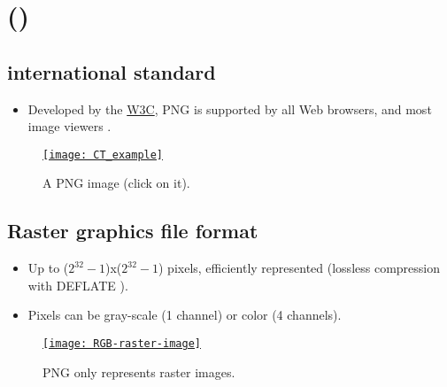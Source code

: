 \chapter{ ()}

\section{ international standard}
\begin{itemize}
\item Developed by the \href{https://www.w3.org/}{W3C}, \gls{PNG}
  \cite{roelofs1999png} is supported by all Web browsers, and most
  image viewers \cite{wikipedia_PNG}.
\end{itemize}
\begin{figure}[H]
  \vspace{-2ex}
  \centering
  \href{https://upload.wikimedia.org/wikipedia/commons/0/05/CT_of_a_normal_abdomen_and_pelvis%2C_coronal_plane_79.png}{\texttt{[image: CT\_example]}}\\
  \caption{A \gls{PNG} image (click on it).}
  \label{fig:PNG_example}
\end{figure}

\section{Raster graphics file format}
\begin{itemize}
\item Up to ($2^{32}-1$)x($2^{32}-1$) pixels, efficiently represented
  (lossless compression with DEFLATE \cite{deutsch1996deflate}).
\item Pixels can be gray-scale (1 channel) or color
   (4 channels).
\end{itemize}
\begin{figure}[H]
  \vspace{-3ex}
  \centering
  \href{https://en.wikipedia.org/wiki/Raster_graphics}{\texttt{[image: RGB-raster-image]}}
  \caption{\gls{PNG} only represents raster images.}
  \label{fig:PNG_raster}
\end{figure}

